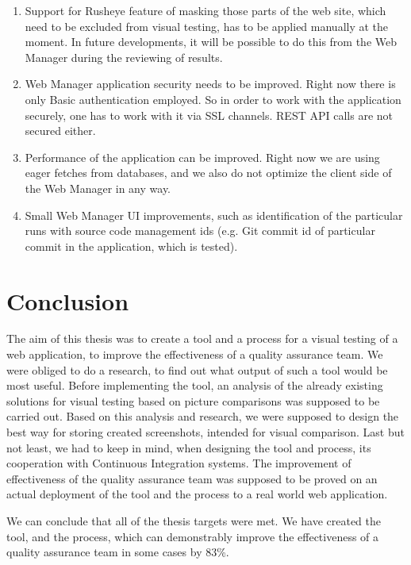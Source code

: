 \documentclass[11pt,oneside,final]{fithesis2}
\begin{document}
\begin{enumerate}
 \item Support for Rusheye feature of masking those parts of the web site, which need to be excluded from visual testing, has to be applied
 manually at the moment. In future developments, it will be possible to do this from the Web Manager during the reviewing of results.
 \item Web Manager application security needs to be improved. Right now there is only Basic authentication employed. So in order to work
 with the application securely, one has to work with it via SSL channels. REST API calls are not secured either.
 \item Performance of the application can be improved. Right now we are using eager fetches from databases, and we also do not optimize
 the client side of the Web Manager in any way.
 \item Small Web Manager UI improvements, such as identification of the particular runs with source code management ids (e.g. Git commit id of
 particular commit in the application, which is tested).
\end{enumerate}


\label{sec:plannedExtensions}
  
\chapter{Conclusion}
The aim of this thesis was to create a tool and a process for a visual testing of a web application, to improve the effectiveness of a 
quality assurance team. We were obliged to do a research, to find out what output of such a tool would be most useful. Before implementing
the tool, an analysis of the already existing solutions for visual testing based on picture comparisons was supposed to be carried out.
Based on this analysis and research, we were supposed to design the best way for storing created screenshots, intended for visual comparison.
Last but not least, we had to keep in mind, when designing the tool and process, its cooperation with Continuous Integration systems.
The improvement of effectiveness of the quality assurance team was supposed to be proved on an actual deployment of the tool and the 
process to a real world web application.

We can conclude that all of the thesis targets were met. We have created the tool, and the process, which can demonstrably improve the effectiveness
of a quality assurance team in some cases by 83\%.
\end{document}
